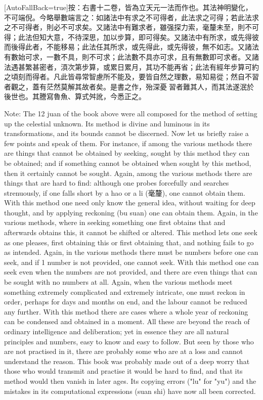 \documentclass[11pt]{article}
\newcommand{\unitlabel}[1]{\marginpar{\raggedleft\tiny\color{gray}#1}}
\newenvironment{unitzh}{\par\CJKfontspec{Noto Serif CJK SC}[AutoFallBack=true]\large\linespread{1.25}\selectfont}{\par}
\newenvironment{uniten}{\par\small\color{black!85}}{\par\medskip}
\begin{document}
\begin{unitzh}\unitlabel{ceyuan-033.20}按：右書十二卷，皆為立天元一法而作也。其法神明變化，不可端倪。今略舉數端言之：如諸法中有求之不可得者，此法求之可得；若此法求之不可得者，則必不可求矣。又諸法中有難求者，雖强探力索，毫釐未至，則不可得；此法但知大意，不待深思，加以步算，即可得矣。又諸法中有所求，或先得彼而後得此者，不能移易；此法任其所求，或先得此，或先得彼，無不如志。又諸法有數始可求，一數不具，則不可求；此法數不具亦可求，且有無數即可求者。又諸法遇甚繁甚密者，湏次第步算，或累日累月，其功不能再省；此法有經年步算可約之頃刻而得者。凡此皆尋常智慮所不能及，要皆自然之理數，易知易從；然自不習者觀之，蓋有茫然莫解其故者矣。是書之作，殆深憂𫝊習者難其人，而其法遂泯於後世也。其謄寫魯魚、算式舛訛，今悉正之。\end{unitzh}
\begin{uniten}Note: The 12 juan of the book above were all composed for the method of setting up the celestial unknown. Its method is divine and luminous in its transformations, and its bounds cannot be discerned. Now let us briefly raise a few points and speak of them. For instance, if among the various methods there are things that cannot be obtained by seeking, sought by this method they can be obtained; and if something cannot be obtained when sought by this method, then it certainly cannot be sought. Again, among the various methods there are things that are hard to find: although one probes forcefully and searches strenuously, if one falls short by a hao or a li (毫釐), one cannot obtain them. With this method one need only know the general idea, without waiting for deep thought, and by applying reckoning (bu suan) one can obtain them. Again, in the various methods, where in seeking something one first obtains that and afterwards obtains this, it cannot be shifted or altered. This method lets one seek as one pleases, first obtaining this or first obtaining that, and nothing fails to go as intended. Again, in the various methods there must be numbers before one can seek, and if 1 number is not provided, one cannot seek. With this method one can seek even when the numbers are not provided, and there are even things that can be sought with no numbers at all. Again, when the various methods meet something extremely complicated and extremely intricate, one must reckon in order, perhaps for days and months on end, and the labour cannot be reduced any further. With this method there are cases where a whole year of reckoning can be condensed and obtained in a moment. All these are beyond the reach of ordinary intelligence and deliberation; yet in essence they are all natural principles and numbers, easy to know and easy to follow. But seen by those who are not practised in it, there are probably some who are at a loss and cannot understand the reason. This book was probably made out of a deep worry that those who would transmit and practise it would be hard to find, and that its method would then vanish in later ages. Its copying errors ("lu" for "yu") and the mistakes in its computational expressions (suan shi) have now all been corrected.\end{uniten}
\end{document}

